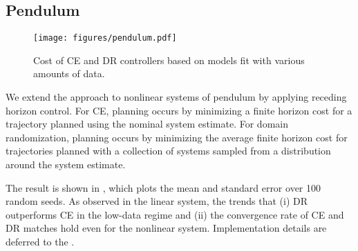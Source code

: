 \subsection{Pendulum}
\begin{wrapfigure}{r}{0.5\textwidth}
    \centering
    \vspace{-90pt}
    \texttt{[image: figures/pendulum.pdf]}
    \vspace{-90pt}
    \caption{Cost of CE and DR controllers based on models fit with various amounts of data.}
    \label{fig:pendulum}    
\end{wrapfigure}

We extend the approach to nonlinear systems of pendulum by applying receding horizon control. For CE, planning occurs by minimizing a finite horizon cost for a trajectory planned using the nominal system estimate. For domain randomization, planning occurs by minimizing the average finite horizon cost for trajectories planned with a collection of systems sampled from a distribution around the system estimate. 

The result is shown in , which plots the mean and standard error over 100 random seeds. As observed in the linear system, the trends that (i) DR outperforms CE in the low-data regime and (ii) the convergence rate of CE and DR matches hold even for the nonlinear system. 
Implementation details are deferred to the .
